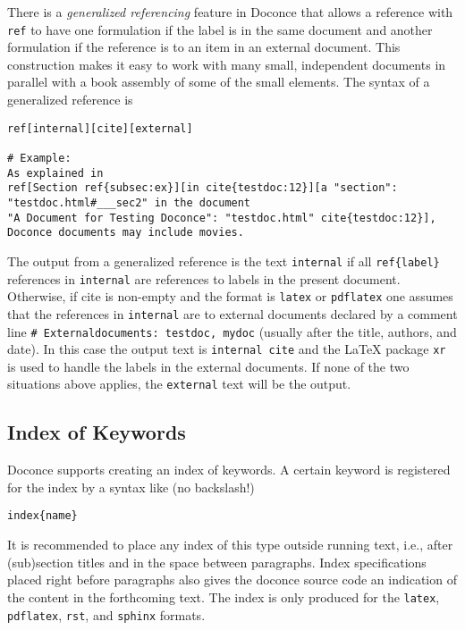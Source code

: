 \documentclass[%
oneside,                 %
final,                   %
10pt]{article}
\begin{document}
There is a \emph{generalized referencing} feature in Doconce that allows
a reference with \Verb!ref! to have one formulation if the label is
in the same document and another formulation if the reference is
to an item in an external document. This construction makes it easy
to work with many small, independent documents in parallel with
a book assembly of some of the small elements.
The syntax of a generalized reference is
\begin{Verbatim}[numbers=none,fontsize=\fontsize{9pt}{9pt},baselinestretch=0.85,xleftmargin=0mm]
ref[internal][cite][external]

# Example:
As explained in
ref[Section ref{subsec:ex}][in cite{testdoc:12}][a "section":
"testdoc.html#___sec2" in the document
"A Document for Testing Doconce": "testdoc.html" cite{testdoc:12}],
Doconce documents may include movies.
\end{Verbatim}
The output from a generalized reference is the text \Verb!internal! if all
\Verb!ref{label}! references in \Verb!internal! are references to labels in the
present document. Otherwise, if cite is non-empty and the format is
\Verb!latex! or \Verb!pdflatex! one assumes that the references in \Verb!internal!
are to external documents declared by a comment line \Verb!# Externaldocuments: testdoc, mydoc! (usually after the title, authors,
and date). In this case the output text is \Verb!internal cite! and the
{\LaTeX} package \Verb!xr! is used to handle the labels in the external
documents.  If none of the two situations above applies, the
\Verb!external! text will be the output.

\subsection{Index of Keywords}

Doconce supports creating an index of keywords. A certain keyword
is registered for the index by a syntax like (no
backslash!)
\begin{Verbatim}[numbers=none,fontsize=\fontsize{9pt}{9pt},baselinestretch=0.85,xleftmargin=0mm]
index{name}
\end{Verbatim}
It is recommended to place any index of this type outside
running text, i.e., after (sub)section titles and in the space between
paragraphs. Index specifications placed right before paragraphs also
gives the doconce source code an indication of the content in the
forthcoming text. The index is only produced for the \Verb!latex!,
\Verb!pdflatex!, \Verb!rst!, and \Verb!sphinx! formats.
\end{document}

